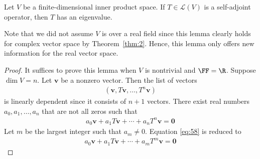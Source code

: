 \documentclass[thmcnt=section, color=blue, 12pt]{my-elegantbook}
\begin{document}
\begin{lemma} \label{lem:3}
	Let $V$ be a finite-dimensional inner product space.
	If $T \in \mathcal{L}(V)$ is a self-adjoint operator,
	then $T$ has an eigenvalue.
\end{lemma}

\begin{note}
	Note that we did not assume $V$ is over a real field
	since this lemma clearly holds for complex vector space 
	by Theorem~\ref{thm:2}.
	Hence, this lemma only offers new information
	for the real vector space.
\end{note}

\begin{proof}
	It suffices to prove this lemma when $V$ is nontrivial 
	and $\FF = \R$.
	Suppose $\dim V = n$.
	Let $\mathbf{v}$ be a nonzero vector.
	Then the list of vectors
	\begin{align*}
		(\mathbf{v}, T \mathbf{v}, \ldots, T^n \mathbf{v})
	\end{align*}
	is linearly dependent since it consists of $n+1$ vectors.
	There exist real numbers $a_0, a_1, \ldots, a_n$ that 
	are not all zeros such that 
	\begin{align}
		a_0 \mathbf{v} + a_1 T \mathbf{v} + \cdots 
		+ a_n T^n \mathbf{v} 
		= \mathbf{0}
		\label{eq:58}
	\end{align}
	Let $m$ be the largest integer such that $a_m \neq 0$. 
	Equation \eqref{eq:58} is reduced to 
	\begin{align}
		a_0 \mathbf{v} + a_1 T \mathbf{v} + \cdots 
		+ a_m T^m \mathbf{v} 
		= \mathbf{0}
		\label{eq:59}
	\end{align}


\end{proof}
\end{document}

